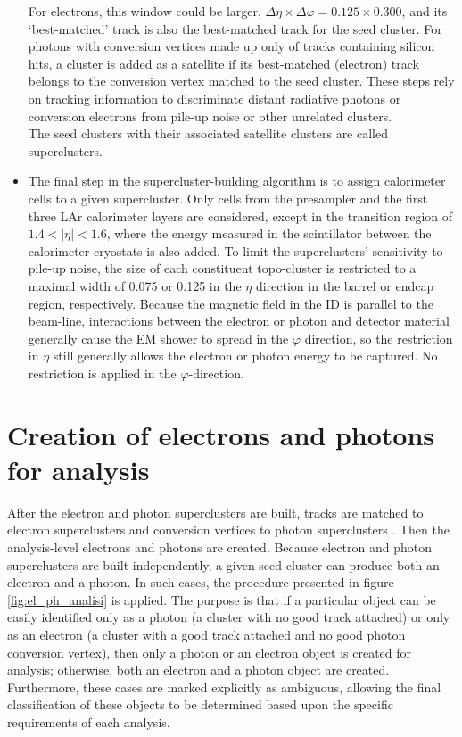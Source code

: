 \documentclass[a4paper, oneside, 11pt, openright]{book}
\begin{document}
\begin{itemize}
		For electrons, this window could be larger, $\Delta\eta \times \Delta\varphi = 0.125 \times 0.300$, and its ‘best-matched’ track is also the best-matched track for the seed cluster. For photons with conversion vertices made up only of tracks containing silicon hits, a cluster is added as a satellite if its best-matched (electron) track belongs to the conversion vertex matched to the seed cluster. These steps rely on tracking information to discriminate distant radiative photons or conversion electrons from pile-up noise or other unrelated clusters. \\
		The seed clusters with their associated satellite clusters are called superclusters.
		
		\item The final step in the supercluster-building algorithm is to assign calorimeter cells to a given supercluster. Only cells from the presampler and the first three LAr calorimeter layers are considered, except in the transition region of $1.4 < |\eta| < 1.6$, where the energy measured in the scintillator between the calorimeter cryostats is also added. To limit the superclusters’ sensitivity to pile-up noise, the size of each constituent topo-cluster is restricted to a maximal width of 0.075 or 0.125 in the $\eta$ direction in the barrel or endcap region, respectively. Because the magnetic field in the ID is parallel to the beam-line, interactions between the electron or photon and detector material generally cause the EM shower to spread in the $\varphi$ direction, so the restriction in $\eta$ still generally allows the electron or photon energy to be captured. No restriction is applied in the $\varphi$-direction.	
		\end{itemize}
		\section{Creation of electrons and photons for analysis}\label{section:creation}
		After the electron and photon superclusters are built, tracks are matched to electron superclusters and conversion vertices to photon superclusters \cite{El ph reco}. Then the analysis-level electrons and photons are created. Because electron and photon superclusters are built independently, a given seed cluster can produce both an electron and a photon. In such cases, the procedure presented in figure \ref{fig:el_ph_analisi} is applied. The purpose is that if a particular object can be easily identified only as a photon (a cluster with no good track attached) or only as an electron (a cluster with a good track attached and no good photon conversion vertex), then only a photon or an electron object is created for analysis; otherwise, both an electron and a photon object are created. Furthermore, these cases are marked explicitly as ambiguous, allowing the final classification of these objects to be determined based upon the specific requirements of each analysis.
	
\end{document}
